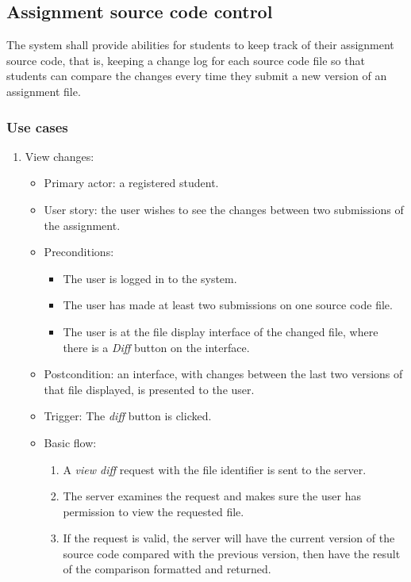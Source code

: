 \subsection{Assignment source code control}
The system shall provide abilities for students to keep track of their
assignment source code, that is, keeping a change log for each source code
file so that students can compare the changes every time they submit a new
version of an assignment file.

\subsubsection{Use cases}
\begin{enumerate}
\item View changes:
\begin{itemize}
    \item Primary actor: a registered student.
    \item User story: the user wishes to see the changes between two
        submissions of the assignment.
    \item Preconditions:
        \begin{itemize}
            \item The user is logged in to the system.
            \item The user has made at least two submissions on one source code
                file.
            \item The user is at the file display interface of the changed file,
                where there is a \emph{Diff} button on the interface.
        \end{itemize}
    \item Postcondition:
        an interface, with changes between the last two versions of that file
        displayed, is presented to the user.
    \item Trigger: The \emph{diff} button is clicked.
    \item Basic flow:
        \begin{enumerate}
            \item A \emph{view diff} request with the file identifier is sent
                to the server.
            \item The server examines the request and makes sure the user has
                permission to view the requested file.
            \item If the request is valid, the server will have the current
                version of the source code compared with the previous version,
                then have the result of the comparison formatted and
                returned.
        \end{enumerate}
\end{itemize}
\end{enumerate}

